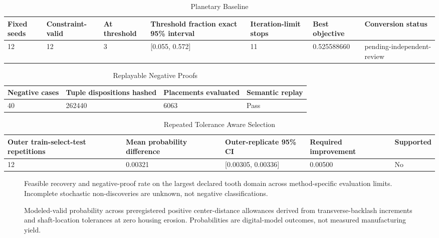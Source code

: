 \documentclass[preprint,12pt]{elsarticle}
\begin{document}
\begin{table}[htbp]
\centering
\caption{Planetary Baseline}
\small
\begin{tabular}{lllllll}
\textbf{Fixed seeds} & \textbf{Constraint-valid} & \textbf{At threshold} & \textbf{Threshold fraction exact 95\% interval} & \textbf{Iteration-limit stops} & \textbf{Best objective} & \textbf{Conversion status} \\
\hline
12 & 12 & 3 & [0.055, 0.572] & 11 & 0.525588660 & pending-independent-review \\
\end{tabular}
\end{table}
\begin{table}[htbp]
\centering
\caption{Replayable Negative Proofs}
\small
\begin{tabular}{llll}
\textbf{Negative cases} & \textbf{Tuple dispositions hashed} & \textbf{Placements evaluated} & \textbf{Semantic replay} \\
\hline
40 & 262440 & 6063 & Pass \\
\end{tabular}
\end{table}
\begin{table}[htbp]
\centering
\caption{Repeated Tolerance Aware Selection}
\small
\begin{tabular}{lllll}
\textbf{Outer train-select-test repetitions} & \textbf{Mean probability difference} & \textbf{Outer-replicate 95\% CI} & \textbf{Required improvement} & \textbf{Supported} \\
\hline
12 & 0.00321 & [0.00305, 0.00336] & 0.00500 & No \\
\end{tabular}
\end{table}
\begin{figure}[htbp]
\centering

\caption{Feasible recovery and negative-proof rate on the largest declared tooth domain across method-specific evaluation limits. Incomplete stochastic non-discoveries are unknown, not negative classifications.}
\end{figure}
\begin{figure}[htbp]
\centering

\caption{Modeled-valid probability across preregistered positive center-distance allowances derived from transverse-backlash increments and shaft-location tolerances at zero housing erosion. Probabilities are digital-model outcomes, not measured manufacturing yield.}
\end{figure}
\end{document}
